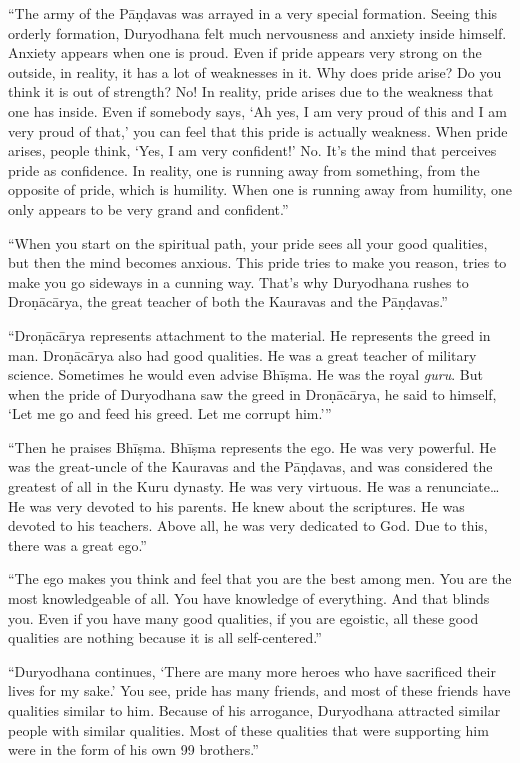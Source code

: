 \enquote{The army of the Pāṇḍavas was arrayed in a very special formation. Seeing this orderly formation, Duryodhana felt much nervousness and anxiety inside himself. Anxiety appears when one is proud. Even if pride appears very strong on the outside, in reality, it has a lot of weaknesses in it. Why does pride arise? Do you think it is out of strength? No! In reality, pride arises due to the weakness that one has inside. Even if somebody says, \enquote{Ah yes, I am very proud of this and I am very proud of that,} you can feel that this pride is actually weakness. When pride arises, people think, \enquote{Yes, I am very confident!} No. It’s the mind that perceives pride as confidence. In reality, one is running away from something, from the opposite of pride, which is humility. When one is running away from humility, one only appears to be very grand and confident.}

\enquote{When you start on the spiritual path, your pride sees all your good qualities, but then the mind becomes anxious. This pride tries to make you reason, tries to make you go sideways in a cunning way. That’s why Duryodhana rushes to Droṇācārya, the great teacher of both the Kauravas and the Pāṇḍavas.}

\enquote{Droṇācārya represents attachment to the material. He represents the greed in man. Droṇācārya also had good qualities. He was a great teacher of military science. Sometimes he would even advise Bhīṣma. He was the royal \textit{guru}. But when the pride of Duryodhana saw the greed in Droṇācārya, he said to himself, \enquote{Let me go and feed his greed. Let me corrupt him.}}

\enquote{Then he praises Bhīṣma. Bhīṣma represents the ego. He was very powerful. He was the great-uncle of the Kauravas and the Pāṇḍavas, and was considered the greatest of all in the Kuru dynasty. He was very virtuous. He was a renunciate\ldots He was very devoted to his parents. He knew about the scriptures. He was devoted to his teachers. Above all, he was very dedicated to God. Due to this, there was a great ego.}

\enquote{The ego makes you think and feel that you are the best among men. You are the most knowledgeable of all. You have knowledge of everything. And that blinds you. Even if you have many good qualities, if you are egoistic, all these good qualities are nothing because it is all self-centered.}

\enquote{Duryodhana continues, \enquote{There are many more heroes who have sacrificed their lives for my sake.} You see, pride has many friends, and most of these friends have qualities similar to him. Because of his arrogance, Duryodhana attracted similar people with similar qualities. Most of these qualities that were supporting him were in the form of his own 99 brothers.}

